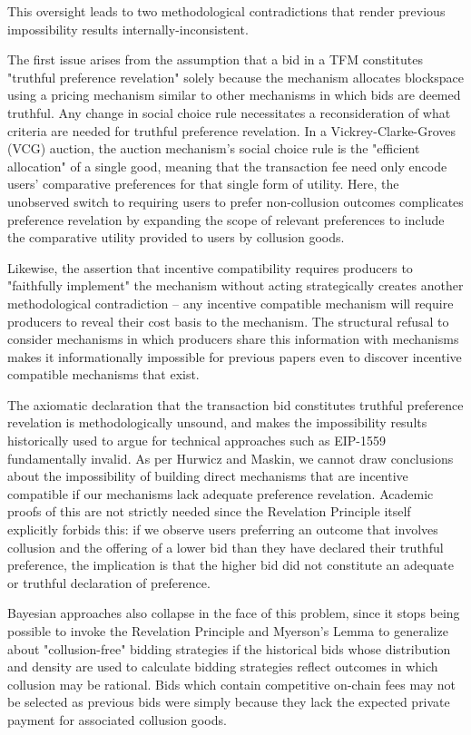 \documentclass[oneside]{article}   	%
\begin{document}
This oversight leads to two methodological contradictions that render previous impossibility results internally-inconsistent.

The first issue arises from the assumption that a bid in a TFM constitutes "truthful preference revelation" solely because the mechanism allocates blockspace using a pricing mechanism similar to other mechanisms in which bids are deemed truthful. Any change in social choice rule necessitates a reconsideration of what criteria are needed for truthful preference revelation. In a Vickrey-Clarke-Groves (VCG) auction, the auction mechanism's social choice rule is the "efficient allocation" of a single good, meaning that the transaction fee need only encode users' comparative preferences for that single form of utility. Here, the unobserved switch to requiring users to prefer non-collusion outcomes complicates preference revelation by expanding the scope of relevant preferences to include the comparative utility provided to users by collusion goods.

Likewise, the assertion that incentive compatibility requires producers to "faithfully implement" the mechanism without acting strategically creates another methodological contradiction -- any incentive compatible mechanism will require producers to reveal their cost basis to the mechanism. The structural refusal to consider mechanisms in which producers share this information with mechanisms makes it informationally impossible for previous papers even to discover incentive compatible mechanisms that exist.

The axiomatic declaration that the transaction bid constitutes truthful preference revelation is methodologically unsound, and makes the impossibility results historically used to argue for technical approaches such as EIP-1559 fundamentally invalid. As per Hurwicz and Maskin, we cannot draw conclusions about the impossibility of building direct mechanisms that are incentive compatible if our mechanisms lack adequate preference revelation. Academic proofs of this are not strictly needed since the Revelation Principle itself explicitly forbids this: if we observe users preferring an outcome that involves collusion and the offering of a lower bid than they have declared their truthful preference, the implication is that the higher bid did not constitute an adequate or truthful declaration of preference.

Bayesian approaches also collapse in the face of this problem, since it stops being possible to invoke the Revelation Principle and Myerson's Lemma to generalize about "collusion-free" bidding strategies if the historical bids whose distribution and density are used to calculate bidding strategies reflect outcomes in which collusion may be rational. Bids which contain competitive on-chain fees may not be selected as previous bids were simply because they lack the expected private payment for associated collusion goods.
\end{document}
